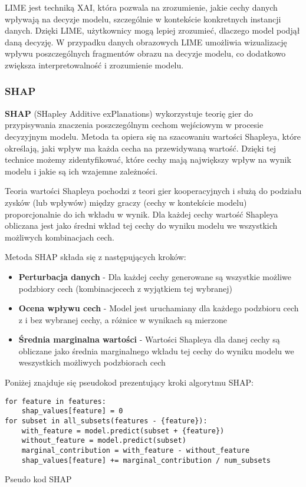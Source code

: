 LIME jest techniką XAI, która pozwala na zrozumienie, jakie cechy danych wpływają na decyzje modelu, szczególnie w kontekście konkretnych instancji danych.
Dzięki LIME, użytkownicy mogą lepiej zrozumieć, dlaczego model podjął daną decyzję.
W przypadku danych obrazowych LIME umożliwia wizualizację wpływu poszczególnych fragmentów obrazu na decyzje modelu, co dodatkowo zwiększa interpretowalność i zrozumienie modelu.

\subsubsection*{SHAP}
\textbf{SHAP} (SHapley Additive exPlanations) wykorzystuje teorię gier do przypisywania znaczenia poszczególnym cechom wejściowym w procesie decyzyjnym modelu.
Metoda ta opiera się na szacowaniu wartości Shapleya, które określają, jaki wpływ ma każda cecha na przewidywaną wartość.
Dzięki tej technice możemy zidentyfikować, które cechy mają największy wpływ na wynik modelu i jakie są ich wzajemne zależności.

Teoria wartości Shapleya pochodzi z teori gier kooperacyjnych i służą do podziału zysków (lub wpływów) między graczy (cechy w kontekście modelu) proporcjonalnie do ich wkładu w wynik.
Dla każdej cechy wartość Shapleya obliczana jest jako średni wkład tej cechy do wyniku modelu we wszystkich możliwych kombinacjach cech.

Metoda SHAP składa się z następujących kroków:
\begin{itemize}
	\item \textbf{Perturbacja danych} - Dla każdej cechy generowane są wszystkie możliwe podzbiory cech (kombinacjecech z wyjątkiem tej wybranej)
	\item \textbf{Ocena wpływu cech} - Model jest uruchamiany dla każdego podzbioru cech z i bez wybranej cechy, a różnice w wynikach są mierzone
	\item \textbf{Średnia marginalna wartości} - Wartości Shapleya dla danej cechy są obliczane jako średnia marginalnego wkładu tej cechy do wyniku modelu we weszystkich możliwych podzbiorach cech
\end{itemize}

Poniżej znajduje się pseudokod prezentujący kroki algorytmu SHAP:
\begin{listing}
	\begin{verbatim}
for feature in features:
    shap_values[feature] = 0
for subset in all_subsets(features - {feature}):
    with_feature = model.predict(subset + {feature})
    without_feature = model.predict(subset)
    marginal_contribution = with_feature - without_feature
    shap_values[feature] += marginal_contribution / num_subsets
\end{verbatim}
	\caption{Pseudo kod SHAP} \label{listing:shap}
\end{listing}

